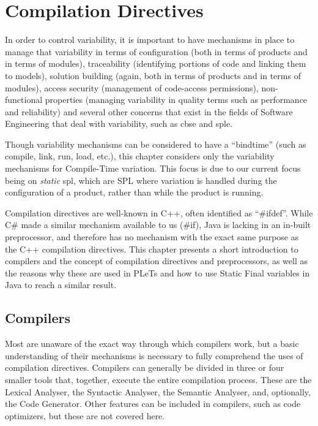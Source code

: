 \chapter{Compilation Directives}
\label{ch:staticfinal}

In order to control variability, it is important to have mechanisms in place to manage that variability in terms of configuration (both in terms of products and in terms of modules), traceability (identifying portions of code and linking them to models), solution building (again, both in terms of products and in terms of modules), access security (management of code-access permissions), non-functional properties (managing variability in quality terms such as performance and reliability) and several other concerns that exist in the fields of Software Engineering that deal with variability, such as \acrfull{cbse} and \acrfull{sple}.

Though variability mechanisms can be considered to have a ``\gls{bindtime}'' (such as compile, link, run, load, etc.), this chapter considers only the variability mechanisms for Compile-Time variation. This focus is due to our current focus being on \emph{static} \acrshort{spl}, which are SPL where variation is handled during the configuration of a product, rather than while the product is running.

Compilation directives are well-known in C++, often identified as ``\#ifdef''. While C\# made a similar mechanism available to us (\#if), Java is lacking in an in-built preprocessor, and therefore has no mechanism with the exact same purpose as the C++ compilation directives. This chapter presents a short introduction to compilers and the concept of compilation directives and preprocessors, as well as the reasons why these are used in PLeTs and how to use Static Final variables in Java to reach a similar result.


\section{Compilers}

Most are unaware of the exact way through which compilers work, but a basic understanding of their mechanisms is necessary to fully comprehend the uses of compilation directives. Compilers can generally be divided in three or four smaller tools that, together, execute the entire compilation process. These are the Lexical Analyser, the Syntactic Analyser, the Semantic Analyser, and, optionally, the Code Generator. Other features can be included in compilers, such as code optimizers, but these are not covered here.

